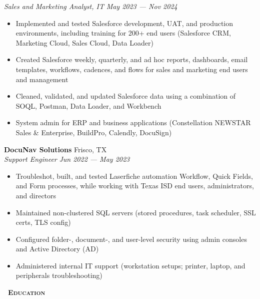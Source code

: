 \documentclass[a4paper,11pt]{article}
\newcommand{\header} [1] {
    \vspace{1mm}
    {\textsc{\textbf{\Large{\xrfill[0.5ex]{0.5pt}~#1~\xrfill[0.5ex]{0.5pt}}}}} %
}
\begin{document}
\textit{Sales and Marketing Analyst, IT} \hfill  \textit{May 2023 --- Nov 2024} 
\begin{itemize}
    \item Implemented and tested Salesforce development, UAT, and production environments, including training for 200+ end users (Salesforce CRM, Marketing Cloud, Sales Cloud, Data Loader) 
    \item Created Salesforce weekly, quarterly, and ad hoc reports, dashboards, email templates, workflows, cadences, and flows for sales and marketing end users and management
    \item Cleaned, validated, and updated Salesforce data using a combination of SOQL, Postman, Data Loader, and Workbench
    \item System admin for ERP and business applications (Constellation NEWSTAR Sales \& Enterprise, BuildPro, Calendly, DocuSign)
\end{itemize}
\vspace{1mm}

\textbf{DocuNav Solutions} \hfill Frisco, TX \\
\textit{Support Engineer} \hfill  \textit{Jun 2022 --- May 2023} 
\begin{itemize}
    \item Troubleshot, built, and tested Laserfiche automation Workflow, Quick Fields, and Form processes, while working with Texas ISD end users, administrators, and directors
    \item Maintained non-clustered SQL servers (stored procedures, task scheduler, SSL certs, TLS config)
    \item Configured folder-, document-, and user-level security using admin consoles and Active Directory (AD)
    \item Administered internal IT support (workstation setups; printer, laptop, and peripherals troubleshooting)
\end{itemize}    
\vspace{1mm}


\header{Education} 
\end{document}
